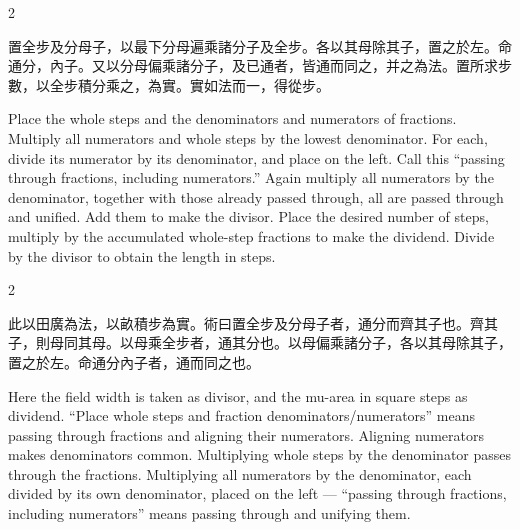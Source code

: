 \documentclass[10pt,a4paper]{article}
\begin{document}
\begin{paracol}{2}

\begin{leftcolumn*}
\begin{methodbi}
置全步及分母子，以最下分母遍乘諸分子及全步。各以其母除其子，置之於左。命通分，內子。又以分母偏乘諸分子，及已通者，皆通而同之，并之為法。置所求步數，以全步積分乘之，為實。實如法而一，得從步。
\end{methodbi}
\end{leftcolumn*}

\begin{rightcolumn*}
\begin{methodbi}
Place the whole steps and the denominators and numerators of fractions. Multiply all numerators and whole steps by the lowest denominator. For each, divide its numerator by its denominator, and place on the left. Call this ``passing through fractions, including numerators.'' Again multiply all numerators by the denominator, together with those already passed through, all are passed through and unified. Add them to make the divisor. Place the desired number of steps, multiply by the accumulated whole-step fractions to make the dividend. Divide by the divisor to obtain the length in steps.
\end{methodbi}
\end{rightcolumn*}

\end{paracol}

\begin{paracol}{2}

\begin{leftcolumn*}
\begin{commentarybi}
此以田廣為法，以畝積步為實。術曰置全步及分母子者，通分而齊其子也。齊其子，則母同其母。以母乘全步者，通其分也。以母偏乘諸分子，各以其母除其子，置之於左。命通分內子者，通而同之也。
\end{commentarybi}
\end{leftcolumn*}

\begin{rightcolumn*}
\begin{commentarybi}
Here the field width is taken as divisor, and the mu-area in square steps as dividend. ``Place whole steps and fraction denominators/numerators'' means passing through fractions and aligning their numerators. Aligning numerators makes denominators common. Multiplying whole steps by the denominator passes through the fractions. Multiplying all numerators by the denominator, each divided by its own denominator, placed on the left --- ``passing through fractions, including numerators'' means passing through and unifying them.
\end{commentarybi}
\end{rightcolumn*}

\end{paracol}
\end{document}
